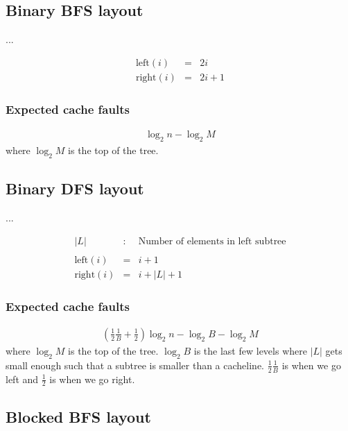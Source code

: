\subsection{Binary BFS layout}

...

\begin{eqnarray*}
\mathrm{left}(i) & = & 2i \\
\mathrm{right}(i) & = & 2i + 1
\end{eqnarray*}

\subsubsection*{Expected cache faults}

\begin{eqnarray*}
\log_2 n - \log_2 M 
\end{eqnarray*}
where $\log_2 M$ is the top of the tree.

\subsection{Binary DFS layout}

...

\begin{eqnarray*}
|L| & : & \textrm{Number of elements in left subtree} \\
\\
\mathrm{left}(i) & = & i + 1 \\
\mathrm{right}(i) & = & i + |L| + 1
\end{eqnarray*}

\subsubsection*{Expected cache faults}

\begin{eqnarray*}
(\frac{1}{2}\frac{1}{B} + \frac{1}{2})\log_2 n - \log_2 B - \log_2 M 
\end{eqnarray*}
where $\log_2 M$ is the top of the tree. $\log_2 B$ is the last few levels where $|L|$ gets small enough such that a subtree is smaller than a cacheline. $\frac{1}{2}\frac{1}{B}$ is when we go left and $\frac{1}{2}$ is when we go right.

\subsection{Blocked BFS layout}

